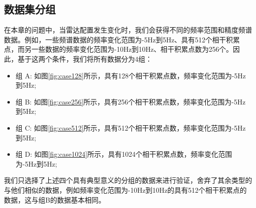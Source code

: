 \subsection{数据集分组}
在本章的问题中，当雷达配置发生变化时，我们会获得不同的频率范围和精度频谱数据。例如，一些频谱数据的频率变化范围为-5Hz到5Hz、具有512个相干积累点，而另一些数据的频率变化范围为-10Hz到10Hz、相干积累点数为256个。因此，基于这两个条件，我们将所有数据分为4组：
\begin{itemize}
	\item 组 A: 如图\ref{fig:case128}所示，具有128个相干积累点数，频率变化范围为-5Hz到5Hz;
	\item 组 B: 如图\ref{fig:case256}所示，具有256个相干积累点数，频率变化范围为-5Hz到5Hz;
	\item 组 C: 如图\ref{fig:case512}所示，具有512个相干积累点数，频率变化范围为-5Hz到5Hz;
	\item 组 D: 如图\ref{fig:case1024}所示，具有1024个相干积累点数，频率变化范围为-5Hz到5Hz;
\end{itemize}
我们只选择了上述四个具有典型意义的分组的数据来进行验证，舍弃了其余类型的与他们相似的数据，例如频率变化范围为-10Hz到10Hz的具有512个相干积累点的数据，这与组B的数据基本相同。
